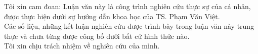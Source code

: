 
Tôi xin cam đoan: Luận văn này là công trình nghiên cứu thực sự của cá nhân, được thực hiện dưới sự hướng dẫn khoa học của TS. Phạm Văn Việt. \\

Các số liệu, những kết luận nghiên cứu được trình bày trong luận văn này trung thực và chưa từng được công bố dưới bất cứ hình thức nào.\\

Tôi xin chịu trách nhiệm về nghiên cứu của mình.




